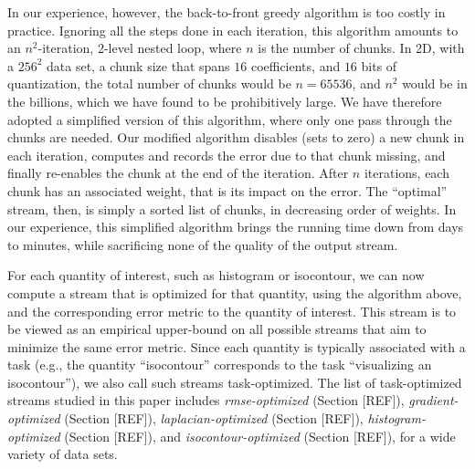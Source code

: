 In our experience, however, the back-to-front greedy algorithm is too costly in practice. Ignoring
all the steps done in each iteration, this algorithm amounts to an $n^2$-iteration, 2-level nested
loop, where $n$ is the number of chunks. In 2D, with a $256^2$ data set, a chunk size that spans
$16$ coefficients, and $16$ bits of quantization, the total number of chunks would be $n=65536$, and
$n^2$ would be in the billions, which we have found to be prohibitively large. We have therefore
adopted a simplified version of this algorithm, where only one pass through the chunks are needed.
Our modified algorithm disables (sets to zero) a new chunk in each iteration, computes and records
the error due to that chunk missing, and finally re-enables the chunk at the end of the iteration.
After $n$ iterations, each chunk has an associated weight, that is its impact on the error. The
``optimal'' stream, then, is simply a sorted list of chunks, in decreasing order of weights. In our
experience, this simplified algorithm brings the running time down from days to minutes, while
sacrificing none of the quality of the output stream.

For each quantity of interest, such as histogram or isocontour, we can now compute a stream that is
optimized for that quantity, using the algorithm above, and the corresponding error metric to the
quantity of interest. This stream is to be viewed as an empirical upper-bound on all possible
streams that aim to minimize the same error metric. Since each quantity is typically associated with
a task (e.g., the quantity ``isocontour'' corresponds to the task ``visualizing an isocontour''), we
also call such streams task-optimized. The list of task-optimized streams studied in this paper
includes \emph{rmse-optimized} (Section [REF]), \emph{gradient-optimized} (Section [REF]),
\emph{laplacian-optimized} (Section [REF]), \emph{histogram-optimized} (Section [REF]), and
\emph{isocontour-optimized} (Section [REF]), for a wide variety of data sets.


